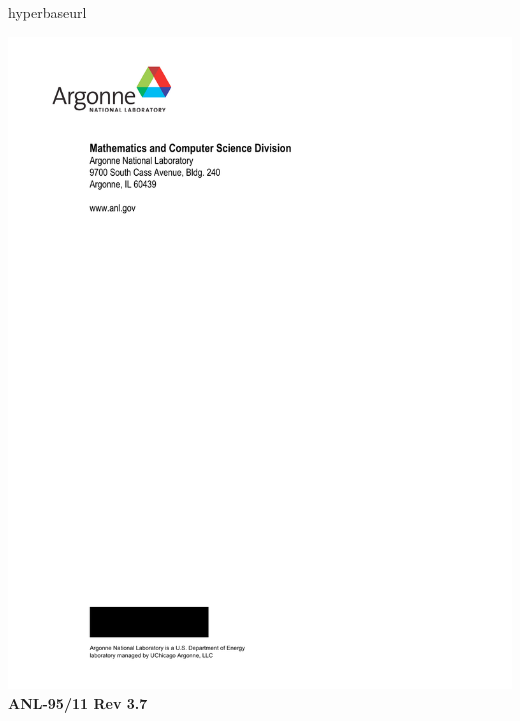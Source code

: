 %
%

hyperbaseurl

\makeindex

\def\design{\medskip \noindent Design Issue:\begin{em}}
\def\enddesign{\end{em} \medskip}


\def\shortintro{false}

\usepackage{fancyhdr,lastpage}
\pagestyle{fancy}





\pagestyle{empty}
\hspace{-.65in}\includegraphics{ArgonneLogo}
\hfill  {\large {\bf ANL-95/11 Rev 3.7}}

